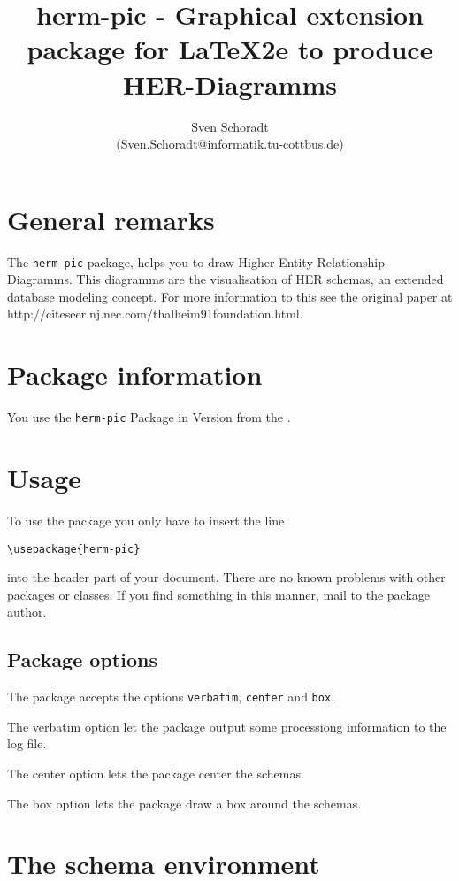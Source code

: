 \documentclass[a4paper,11pt]{article}
\author{Sven Schoradt \\ (Sven.Schoradt@informatik.tu-cottbus.de)}
\title{herm-pic - Graphical extension package for LaTeX2e to produce HER-Diagramms}
\begin{document}
\maketitle

\section{General remarks}

The {\tt herm-pic} package, helps you to draw Higher Entity Relationship Diagramms.
This diagramms are the visualisation of HER schemas, an extended database modeling 
concept. For more information to this see the original paper at 
http://citeseer.nj.nec.com/thalheim91foundation.html.

\section{Package information}

You use the {\tt herm-pic} Package in Version \HPlongrevision{} from the \HPdate.

\section{Usage}

To use the package you only have to insert the line

\begin{verbatim}
\usepackage{herm-pic}
\end{verbatim}

into the header part of your document. There are no known problems with other
packages or classes. If you find something in this manner, mail to the package 
author.

\subsection{Package options}

The package accepts the options {\tt verbatim}, {\tt center} and {\tt box}.

The verbatim option let the package output some processiong information to the
log file.

The center option lets the package center the schemas.

The box option lets the package draw a box around the schemas.

\section{The schema environment}
\end{document}
